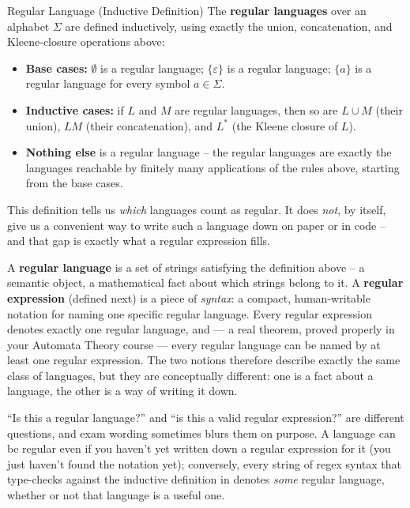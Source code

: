 \documentclass[full-course-notes.tex]{subfiles}
\begin{document}
\begin{defbox}{Regular Language (Inductive Definition)}
The \textbf{regular languages} over an alphabet $\Sigma$ are defined inductively, using exactly
the union, concatenation, and Kleene-closure operations above:
\begin{itemize}
  \item \textbf{Base cases:} $\emptyset$ is a regular language; $\{\varepsilon\}$ is a regular
  language; $\{a\}$ is a regular language for every symbol $a \in \Sigma$.
  \item \textbf{Inductive cases:} if $L$ and $M$ are regular languages, then so are
  $L \cup M$ (their union), $LM$ (their concatenation), and $L^{*}$ (the Kleene closure of $L$).
  \item \textbf{Nothing else} is a regular language -- the regular languages are exactly the
  languages reachable by finitely many applications of the rules above, starting from the base
  cases.
\end{itemize}
\end{defbox}

This definition tells us \emph{which} languages count as regular. It does \emph{not}, by
itself, give us a convenient way to write such a language down on paper or in code -- and that
gap is exactly what a regular expression fills.

\begin{coreidea}
A \textbf{regular language} is a set of strings satisfying the definition above -- a semantic
object, a mathematical fact about which strings belong to it. A \textbf{regular expression}
(defined next) is a piece of \emph{syntax}: a compact, human-writable notation for naming one
specific regular language. Every regular expression denotes exactly one regular language, and
--- a real theorem, proved properly in your Automata Theory course --- every regular language
can be named by at least one regular expression. The two notions therefore describe exactly the
same class of languages, but they are conceptually different: one is a fact about a language,
the other is a way of writing it down.
\end{coreidea}

\begin{examfocus}
``Is this a regular language?'' and ``is this a valid regular expression?'' are different
questions, and exam wording sometimes blurs them on purpose. A language can be regular even if
you haven't yet written down a regular expression for it (you just haven't found the notation
yet); conversely, every string of regex syntax that type-checks against the inductive definition
in  denotes \emph{some} regular language, whether or not that
language is a useful one.
\end{examfocus}
\end{document}
